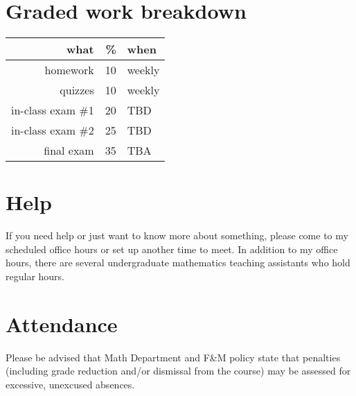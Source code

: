 \documentclass[12pt]{article}
\begin{document}
\section*{Graded work breakdown}
\begin{tabular}{r | r | l}
what & \% & when \\
\hline
homework & 10 & weekly\\
quizzes & 10 & weekly\\
in-class exam \#1 & 20 & TBD \\
in-class exam \#2 & 25 & TBD \\
final exam & 35 & TBA \\
\end{tabular}

\section*{Help}
If you need help or just want to know more about something, please come to my scheduled office hours or set up another time to meet. In addition to my office hours, there are several undergraduate mathematics teaching assistants who hold regular hours.

\section*{Attendance}
Please be advised that Math Department and F\&M policy state that penalties (including
grade reduction and/or dismissal from the course) may be assessed for
excessive, unexcused absences.
\end{document}
